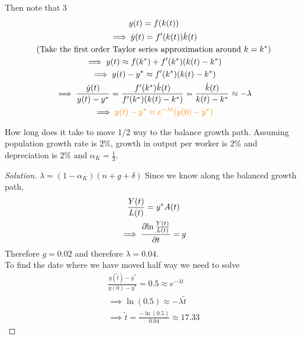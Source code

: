 \documentclass[]{article}
\begin{document}
	    Then note that 3
	    \begin{gather*}
	        y(t) = f(k(t)) \\
	        \implies \dot{y}(t) = f'(k(t))\dot{k}(t) \\
	        \text{{(Take the first order Taylor series approximation around $k=k^*$)}} \\
	        \implies y(t) \approx f(k^*) + f'(k^*) (k(t)-k^*) \\
	        \implies y(t) - y^* \approx f'(k^*)(k(t) - k^*) \\
	        \implies \frac{\dot{y}(t)}{y(t) - y^*} = \frac{f'(k^*)\dot{k}(t)}{f'(k^*)(k(t) - k^*)} = \frac{\dot{k}(t)}{k(t) - k^*} \approx - \lambda \\
	       \implies \textcolor{orange}{
	       		y(t) - y^* \approx e^{- \lambda t} (y(0) - y^*)
	       }
	    \end{gather*}
	    
	    \begin{example}
	        How long does it take to move 1/2 way to the balance growth path. Assuming population growth rate is $2\%$, growth in output per worker is $2\%$ and depreciation is $2\%$ and  $\alpha_K = \frac{1}{3}$.
	        \begin{proof}[Solution]
	            $\lambda = (1 - \alpha_K)(n + g + \delta)$ 
	            Since we know along the balanced growth path, \begin{gather*}
	                \frac{Y(t)}{L(t)} = y^* A(t) \\
	                \implies \frac{\partial{\ln{\frac{Y(t)}{L(t)}}}}{\partial{t}} = g
	            \end{gather*}
	            Therefore $g = 0.02$ and therefore $\lambda = 0.04$. \\
	            To find the date where we have moved half way we need to solve 
	            \begin{gather*}
	                \frac{y(\tilde{t}) - y^*}{y(0) - y^*} = 0.5 \approx e^{-\lambda t}\\
	                \implies \ln(0.5) \approx -\lambda \tilde{t} \\
	                \implies \tilde{t} = \frac{-\ln(0.5)}{0.04} \approx 17.33
	            \end{gather*}
	        \end{proof}
	    \end{example}
	    
\end{document}
